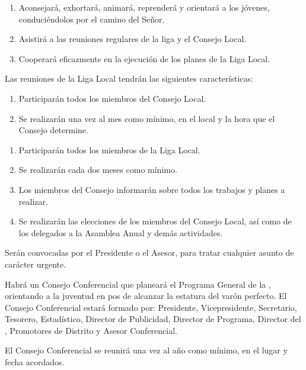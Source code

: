 \begin{enumerate}
    \item Aconsejará, exhortará, animará, reprenderá y orientará a los jóvenes, conduciéndolos por el camino del Señor.
    \item Asistirá a las reuniones regulares de la liga y el Consejo Local.
    \item Cooperará eficazmente en la ejecución de los planes de la Liga Local.
\end{enumerate}

\article
\label{reuniones-locales}
Las reuniones de la Liga Local tendrán las siguientes características:

\begin{enumerate}
    \item Participarán todos los miembros del Consejo Local.
    \item Se realizarán una vez al mes como mínimo, en el local y la hora que el Consejo determine.
\end{enumerate}

\begin{enumerate}
    \item Participarán todos los miembros de la Liga Local.
    \item Se realizarán cada dos meses como mínimo.
    \item Los miembros del Consejo informarán sobre todos los trabajos y planes a realizar.
    \item Se realizarán las elecciones de los miembros del Consejo Local, así como de los delegados a la Asamblea Anual y demás actividades.
\end{enumerate}

Serán convocadas por el Presidente o el Asesor, para tratar cualquier asunto de carácter urgente.


\article
Habrá un Consejo Conferencial que planeará el Programa General de la \LMJ{}, orientando a la juventud en pos de alcanzar la estatura del varón perfecto. El Consejo Conferencial estará formado por: Presidente, Vicepresidente, Secretario, Tesorero, Estadístico, Director de Publicidad, Director de Programa, Director del \OOLMJ{}, Promotores de Distrito y Asesor Conferencial.

\article
\label{reunion-consejo-conferencial}
El Consejo Conferencial se reunirá una vez al año como mínimo, en el lugar y fecha acordados.

